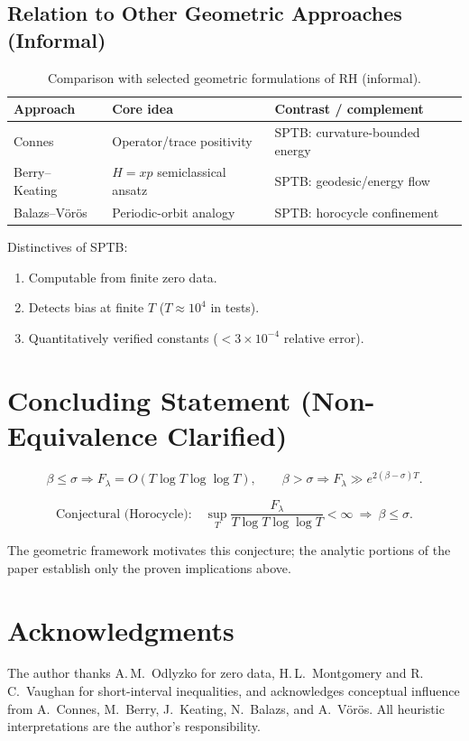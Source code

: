 \subsection{Relation to Other Geometric Approaches (Informal)}

\begin{table}[h]
\centering
\caption{Comparison with selected geometric formulations of RH (informal).}
\begin{tabular}{lll}
\toprule
Approach & Core idea & Contrast / complement \\
\midrule
Connes~\cite{connes} & Operator/trace positivity & SPTB: curvature-bounded energy \\
Berry--Keating~\cite{berry-keating} & $H=xp$ semiclassical ansatz & SPTB: geodesic/energy flow \\
Balazs--V\"or\"os~\cite{balazs-voros} & Periodic-orbit analogy & SPTB: horocycle confinement \\
\bottomrule
\end{tabular}
\end{table}

Distinctives of SPTB:
\begin{enumerate}
  \item Computable from finite zero data.  
  \item Detects bias at finite $T$ ($T\!\approx\!10^4$ in tests).  
  \item Quantitatively verified constants ($<3\times10^{-4}$ relative error).  
\end{enumerate}

\section{Concluding Statement (Non-Equivalence Clarified)}

\[
\boxed{
\beta\le\sigma \Rightarrow F_\lambda=O(T\log T\log\log T),
\qquad
\beta>\sigma \Rightarrow F_\lambda\gg e^{2(\beta-\sigma)T}.
}
\]

\[
\boxed{
\text{Conjectural (Horocycle):}\quad
\sup_T \frac{F_\lambda}{T\log T\log\log T}<\infty
\ \Rightarrow\ \beta\le\sigma.
}
\]

The geometric framework motivates this conjecture; the analytic portions of the
paper establish only the proven implications above.

\section*{Acknowledgments}

The author thanks A.\,M.~Odlyzko for zero data,
H.\,L.~Montgomery and R.\,C.~Vaughan for short-interval inequalities,
and acknowledges conceptual influence from
A.~Connes, M.~Berry, J.~Keating, N.~Balazs, and A.~Vörös.
All heuristic interpretations are the author’s responsibility.